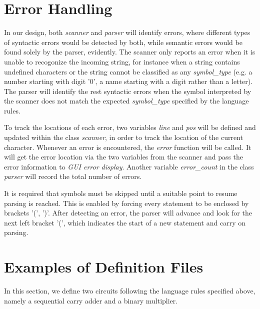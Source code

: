 \documentclass[12pt]{article}
\def\n{\noindent}
\begin{document}
\section{Error Handling}
In our design, both \textit{scanner} and \textit{parser} will identify errors, where different types of syntactic errors would be detected by both, while semantic errors would be found solely by the parser, evidently. The scanner only reports an error when it is unable to recogonize the incoming string, for instance when a string contains undefined characters or the string cannot be classified as any \emph{symbol\_type} (e.g. a number starting with digit '0', a name starting with a digit rather than a letter). The parser will identify the rest syntactic errors when the symbol interpreted by the scanner does not match the expected \emph{symbol\_type} specified by the language rules.

\n To track the locations of each error, two variables \textit{line} and \textit{pos} will be defined and updated within the class \textit{scanner}, in order to track the location of the current character. Whenever an error is encountered, the \textit{error} function will be called. It will get the error location via the two variables from the scanner and pass the error information to \textit{GUI error display}. Another variable \emph{error\_count} in the class \textit{parser} will record the total number of errors.

\n It is required that symbols must be skipped until a suitable point to resume parsing is reached. This is enabled by forcing every statement to be enclosed by brackets '(', ')'. After detecting an error, the parser will advance and look for the next left bracket '(', which indicates the start of a new statement and carry on parsing.

\section{Examples of Definition Files}
In this section, we define two circuits following the language rules specified above, namely a sequential carry adder and a binary multiplier.
\end{document}
